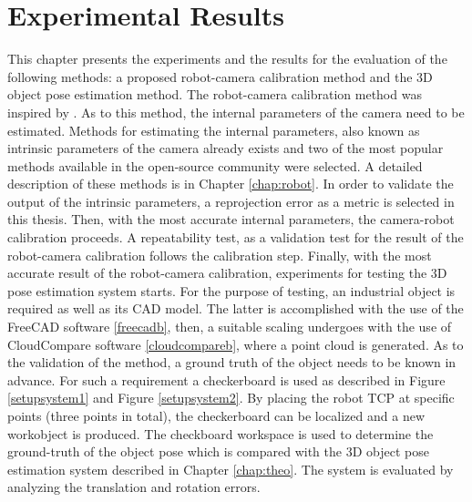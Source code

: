 
\chapter{Experimental Results}
\label{chap:exp}

This chapter presents the experiments and the results for the evaluation of the following methods: a proposed robot-camera calibration method and the 3D object pose estimation method. The robot-camera calibration method was inspired by \cite{autCAL2}. As to this method, the internal parameters of the camera need to be estimated. Methods for estimating the internal parameters, also known as intrinsic parameters of the camera already exists and two of the most popular methods available in the open-source community were selected. A detailed description of these methods is in Chapter \ref{chap:robot}. In order to validate the output of the intrinsic parameters, a reprojection error as a metric is selected in this thesis. Then, with the most accurate internal parameters, the camera-robot calibration proceeds. A repeatability test, as a validation test for the result of the robot-camera calibration follows the calibration step. Finally, with the most accurate result of the robot-camera calibration, experiments for testing the 3D pose estimation system starts. For the purpose of testing, an industrial object is required as well as its CAD model. The latter is accomplished with the use of the FreeCAD software \ref{freecadb}, then, a suitable scaling undergoes with the use of CloudCompare software \ref{cloudcompareb}, where a point cloud is generated. As to the validation of the method, a ground truth of the object needs to be known in advance. For such a requirement a checkerboard is used as described in Figure \ref{setupsystem1} and Figure \ref{setupsystem2}. By placing the robot TCP at specific points (three points in total), the checkerboard can be localized and a new workobject is produced. The checkboard workspace is used to determine the ground-truth of the object pose which is compared with the 3D object pose estimation system described in Chapter \ref{chap:theo}. The system is evaluated by analyzing the translation and rotation errors. 

